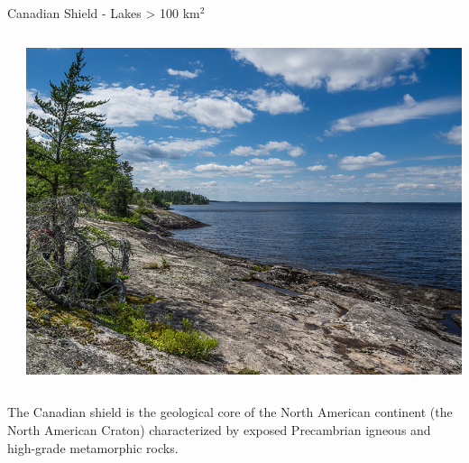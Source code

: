 \documentclass[compress,english]{beamer}
\begin{document}
\begin{frame}{Canadian Shield - Lakes > 100 km$^2$}

\begin{columns}
\begin{column}{0.6\textwidth}
\begin{center}
\end{center}
\end{column}
\begin{column}{0.4\textwidth}
\begin{center}
\includegraphics[width=\textwidth]{27843082153_d07e65b8ce_z.jpg}

\end{center}
\end{column}
\end{columns}

The Canadian shield is the geological core of the North American continent (the North American Craton) characterized by exposed Precambrian igneous and high-grade metamorphic rocks.
\end{frame}
\end{document}
